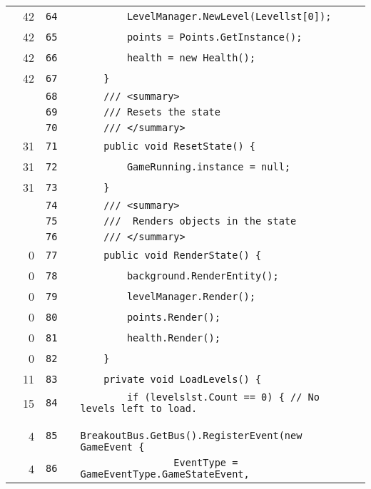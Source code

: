 \documentclass[a4paper,landscape,10pt]{article}
\begin{document}
\begin{longtable}[l]{lrrll}
\cellcolor{green} & 42 & \verb~64~ & & \verb~        LevelManager.NewLevel(Levellst[0]);~\\
\cellcolor{green} & 42 & \verb~65~ & & \verb~        points = Points.GetInstance();~\\
\cellcolor{green} & 42 & \verb~66~ & & \verb~        health = new Health();~\\
\cellcolor{green} & 42 & \verb~67~ & & \verb~    }~\\
\cellcolor{gray} &  & \verb~68~ & & \verb~    /// <summary>~\\
\cellcolor{gray} &  & \verb~69~ & & \verb~    /// Resets the state~\\
\cellcolor{gray} &  & \verb~70~ & & \verb~    /// </summary>~\\
\cellcolor{green} & 31 & \verb~71~ & & \verb~    public void ResetState() {~\\
\cellcolor{green} & 31 & \verb~72~ & & \verb~        GameRunning.instance = null;~\\
\cellcolor{green} & 31 & \verb~73~ & & \verb~    }~\\
\cellcolor{gray} &  & \verb~74~ & & \verb~    /// <summary>~\\
\cellcolor{gray} &  & \verb~75~ & & \verb~    ///  Renders objects in the state~\\
\cellcolor{gray} &  & \verb~76~ & & \verb~    /// </summary>~\\
\cellcolor{red} & 0 & \verb~77~ & & \verb~    public void RenderState() {~\\
\cellcolor{red} & 0 & \verb~78~ & & \verb~        background.RenderEntity();~\\
\cellcolor{red} & 0 & \verb~79~ & & \verb~        levelManager.Render();~\\
\cellcolor{red} & 0 & \verb~80~ & & \verb~        points.Render();~\\
\cellcolor{red} & 0 & \verb~81~ & & \verb~        health.Render();~\\
\cellcolor{red} & 0 & \verb~82~ & & \verb~    }~\\
\cellcolor{green} & 11 & \verb~83~ & & \verb~    private void LoadLevels() {~\\
\cellcolor{green} & 15 & \verb~84~ & & \verb~        if (levelslst.Count == 0) { // No levels left to load.~\\
\cellcolor{green} & 4 & \verb~85~ & & \verb~            BreakoutBus.GetBus().RegisterEvent(new GameEvent {~\\
\cellcolor{green} & 4 & \verb~86~ & & \verb~                EventType = GameEventType.GameStateEvent,~\\

\end{longtable}
\end{document}
